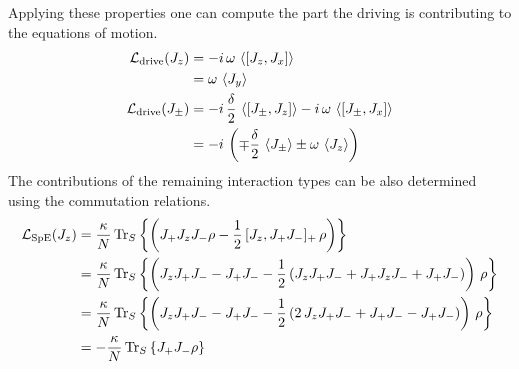     Applying these properties one can compute the part the driving is contributing to the equations of motion.
    \begin{align*}
        \mathcal{L}_\text{drive}(J_z)&=-i\,\omega\,\braket{[J_z,J_x]}\\
        &=\omega\,\braket{J_y}\\
        \mathcal{L}_\text{drive}(J_\pm)&=-i\,\frac{\delta}{2}\,\braket{[J_\pm,J_z]}-i\,\omega\,\braket{[J_\pm,J_x]}\\
        &=-i\,\left(\mp\frac{\delta}{2}\, \braket{J_\pm} \pm \omega\, \braket{J_z}\right)
    \end{align*}
    The contributions of the remaining interaction types can be also determined using the commutation relations.
    \begin{align*}
        \mathcal{L}_\text{SpE}(J_z)&=\frac{\kappa}{N}\,\text{Tr}_S\left\{\left(J_+ J_z J_- \rho-\frac{1}{2}\,[J_z,J_+ J_-]_+\,\rho\right)\right\}\\
        &=\frac{\kappa}{N}\,\text{Tr}_S\left\{\left(J_z J_+ J_- - J_+ J_- -\frac{1}{2}\,(J_z J_+ J_- + J_+ J_z J_- + J_+ J_-)\right)\,\rho\right\}\\
        &=\frac{\kappa}{N}\,\text{Tr}_S\left\{\left(J_z J_+ J_- - J_+ J_- -\frac{1}{2}\,(2\,J_z J_+ J_- + J_+ J_- - J_+ J_-)\right)\,\rho\right\}\\
        &=-\frac{\kappa}{N}\,\text{Tr}_S\left\{J_+ J_- \rho\right\}
    \end{align*}

